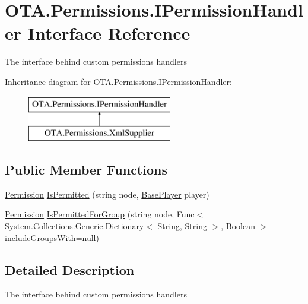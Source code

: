 \hypertarget{interface_o_t_a_1_1_permissions_1_1_i_permission_handler}{}\section{O\+T\+A.\+Permissions.\+I\+Permission\+Handler Interface Reference}
\label{interface_o_t_a_1_1_permissions_1_1_i_permission_handler}


The interface behind custom permissions handlers  


Inheritance diagram for O\+T\+A.\+Permissions.\+I\+Permission\+Handler\+:\begin{figure}[H]
\begin{center}
\leavevmode
\includegraphics[height=2.000000cm]{interface_o_t_a_1_1_permissions_1_1_i_permission_handler}
\end{center}
\end{figure}
\subsection*{Public Member Functions}
\begin{DoxyCompactItemize}
\item 
\hyperlink{namespace_o_t_a_1_1_permissions_a18c21ab0745d885bbcfdc768e07c31b6}{Permission} \hyperlink{interface_o_t_a_1_1_permissions_1_1_i_permission_handler_a1378a92fa4c685e9cc21011480dba046}{Is\+Permitted} (string node, \hyperlink{class_o_t_a_1_1_base_player}{Base\+Player} player)
\item 
\hyperlink{namespace_o_t_a_1_1_permissions_a18c21ab0745d885bbcfdc768e07c31b6}{Permission} \hyperlink{interface_o_t_a_1_1_permissions_1_1_i_permission_handler_a981197e541d6dfaa8e834a8f14d43dc3}{Is\+Permitted\+For\+Group} (string node, Func$<$ System.\+Collections.\+Generic.\+Dictionary$<$ String, String $>$, Boolean $>$ include\+Groups\+With=null)
\end{DoxyCompactItemize}


\subsection{Detailed Description}
The interface behind custom permissions handlers 



